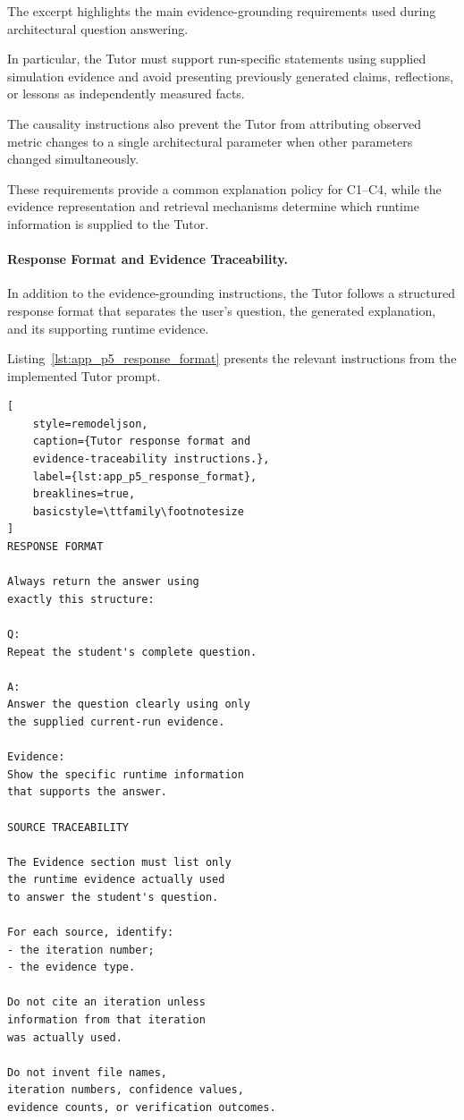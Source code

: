 The excerpt highlights the main
evidence-grounding requirements
used during architectural question
answering.

In particular, the Tutor must
support run-specific statements
using supplied simulation evidence
and avoid presenting previously
generated claims, reflections,
or lessons as independently
measured facts.

The causality instructions also
prevent the Tutor from attributing
observed metric changes to a
single architectural parameter
when other parameters changed
simultaneously.

These requirements provide a
common explanation policy for
C1--C4, while the evidence
representation and retrieval
mechanisms determine which
runtime information is supplied
to the Tutor.


\paragraph{Response Format and Evidence Traceability.}

In addition to the evidence-grounding
instructions, the Tutor follows a
structured response format that
separates the user's question,
the generated explanation, and
its supporting runtime evidence.

Listing~\ref{lst:app_p5_response_format}
presents the relevant instructions
from the implemented Tutor prompt.

\begin{lstlisting}[
    style=remodeljson,
    caption={Tutor response format and
    evidence-traceability instructions.},
    label={lst:app_p5_response_format},
    breaklines=true,
    basicstyle=\ttfamily\footnotesize
]
RESPONSE FORMAT

Always return the answer using
exactly this structure:

Q:
Repeat the student's complete question.

A:
Answer the question clearly using only
the supplied current-run evidence.

Evidence:
Show the specific runtime information
that supports the answer.

SOURCE TRACEABILITY

The Evidence section must list only
the runtime evidence actually used
to answer the student's question.

For each source, identify:
- the iteration number;
- the evidence type.

Do not cite an iteration unless
information from that iteration
was actually used.

Do not invent file names,
iteration numbers, confidence values,
evidence counts, or verification outcomes.
\end{lstlisting}

